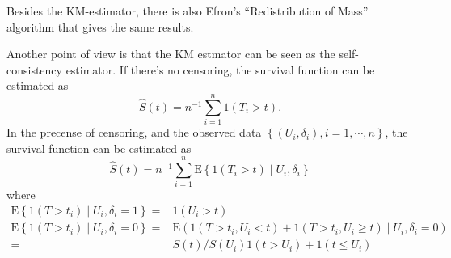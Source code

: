 \documentclass[a4paper,12pt]{article}
\begin{document}
Besides the KM-estimator, there is also Efron's ``Redistribution of Mass'' algorithm that gives the same results.
\par
Another point of view is that the KM estmator can be seen as the self-consistency estimator. If there's no censoring, the survival function can be estimated as
\[
  \hat{S}\left(t\right) = n^{-1} \sum\limits_{i = 1}^n1\left(T_i > t\right)
  .
\]
In the precense of censoring, and the observed data $\left\{\left(U_i, \delta_i\right), i = 1, \cdots, n\right\}$, the survival function can be estimated as
\[
  \hat{S}\left(t\right)
  = n^{-1}\sum\limits_{i = 1}^n
  \mathrm{E}\left\{
    1\left(T_i > t\right)
    \middle| U_i, \delta_i
  \right\}
\]
where
\[
  \begin{aligned}
    \mathrm{E}\left\{1\left(T > t_i\right)\middle| U_i, \delta_i = 1\right\}
      =& 1(U_i > t)    \\
    \mathrm{E}\left\{1\left(T > t_i\right)\middle| U_i, \delta_i = 0\right\}
      =& \mathrm{E}\left(
      1\left(T > t_i, U_i < t\right)
      + 1\left(T > t_i, U_i \geq t\right)\middle| U_i, \delta_i = 0\right)    \\
    =& S\left(t\right) / S\left(U_i\right) 1\left(t > U_i\right) + 1\left(t \leq U_i\right)
  \end{aligned}
\]



\end{document}

